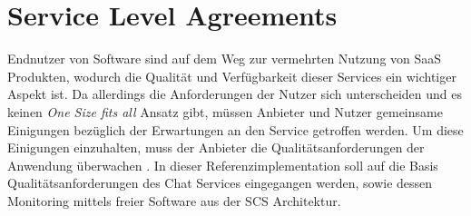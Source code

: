 \chapter{Service Level Agreements}
\label{chapter:sla}
Endnutzer von Software sind auf dem Weg zur vermehrten Nutzung von \ac{SaaS} Produkten, wodurch
die Qualität und Verfügbarkeit dieser Services ein wichtiger Aspekt ist. Da allerdings die 
Anforderungen der Nutzer sich unterscheiden und es keinen \emph{One Size fits all} Ansatz gibt,
müssen Anbieter und Nutzer gemeinsame Einigungen bezüglich der Erwartungen an den Service getroffen werden.
Um diese Einigungen einzuhalten, muss der Anbieter die Qualitätsanforderungen der Anwendung überwachen \cite{Ranabahu2009}.
In dieser Referenzimplementation soll auf die Basis Qualitätsanforderungen des Chat Services eingegangen werden,
sowie dessen Monitoring mittels freier Software aus der \ac{SCS} Architektur. 